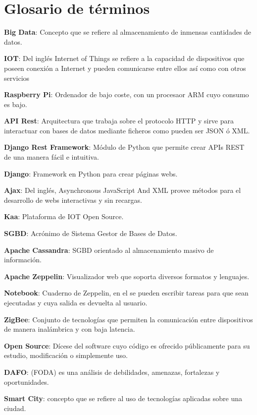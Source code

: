 \chapter{Glosario de términos}

\textbf{Big Data}: Concepto que se refiere al almacenamiento de inmensas cantidades de datos.
\bigskip

\textbf{IOT}: Del inglés Internet of Things se refiere a la capacidad de dispositivos que poseen conexión a Internet y pueden comunicarse entre ellos así como con otros servicios
\bigskip

\textbf{Raspberry Pi}: Ordenador de bajo coste, con un procesaor ARM cuyo consumo es bajo.
\bigskip

\textbf{API Rest}: Arquitectura que trabaja sobre el protocolo HTTP y sirve para interactuar con bases de datos mediante ficheros como pueden ser JSON ó XML.
\bigskip

\textbf{Django Rest Framework}: Módulo de Python que permite crear APIs REST de una manera fácil e intuitiva.
\bigskip

\textbf{Django}: Framework en Python para crear páginas webs.
\bigskip


\textbf{Ajax}: Del inglés, Asynchronous JavaScript And XML provee métodos para el desarrollo de webs interactivas y sin recargas.
\bigskip


\textbf{Kaa}: Plataforma de IOT Open Source.
\bigskip


\textbf{SGBD}: Acrónimo de Sistema Gestor de Bases de Datos.
\bigskip


\textbf{Apache Cassandra}: SGBD orientado al almacenamiento masivo de información.
\bigskip


\textbf{Apache Zeppelin}: Visualizador web que soporta diversos formatos y lenguajes.
\bigskip


\textbf{Notebook}: Cuaderno de Zeppelin, en el se pueden escribir tareas para que sean ejecutadas y cuya salida es devuelta al usuario.
\bigskip


\textbf{ZigBee}: Conjunto de tecnologías que permiten la comunicación entre dispositivos de manera inalámbrica y con baja latencia.
\bigskip


\textbf{Open Source}: Dícese del software cuyo código es ofrecido públicamente para su estudio, modificación o simplemente uso.
\bigskip

\textbf{DAFO}: (FODA) es una análisis de debilidades, amenazas, fortalezas y oportunidades.
\bigskip

\textbf{Smart City}: concepto que se refiere al uso de tecnologías aplicadas sobre una ciudad.
\bigskip

